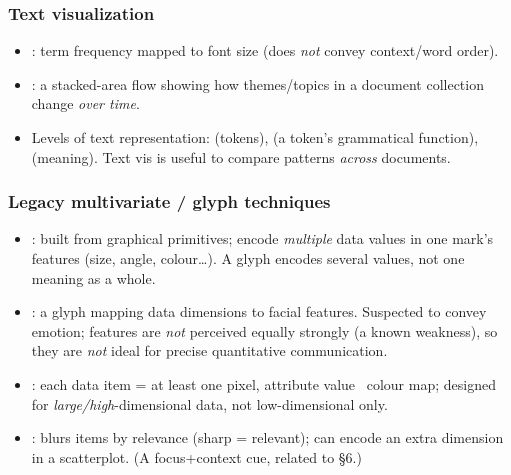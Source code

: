 \subsubsection{Text visualization}
\begin{itemize}
  \item {}: term frequency mapped to font size (does
        \emph{not} convey context/word order).
  \item {}: a stacked-area flow showing how
        themes/topics in a document collection change \emph{over time}.
  \item Levels of text representation:  (tokens), 
        (a token's grammatical function),  (meaning). Text vis is
        useful to compare patterns \emph{across} documents.
\end{itemize}

\subsubsection{Legacy multivariate / glyph techniques}
\begin{keybox}
\begin{itemize}
  \item {}: built from graphical primitives; encode
        \emph{multiple} data values in one mark's features (size, angle,
        colour\dots). A glyph encodes several values, not one meaning as a whole.
  \item {}: a glyph mapping data dimensions to facial
        features. Suspected to convey emotion; features are \emph{not} perceived
        equally strongly (a known weakness), so they are \emph{not} ideal for
        precise quantitative communication.
  \item {}: each data item = at least one pixel,
        attribute value \textrightarrow\ colour map; designed for \emph{large/high}-dimensional
        data, not low-dimensional only.
  \item {}: blurs items by relevance (sharp =
        relevant); can encode an extra dimension in a scatterplot. (A focus+context
        cue, related to \S6.)
\end{itemize}
\end{keybox}

